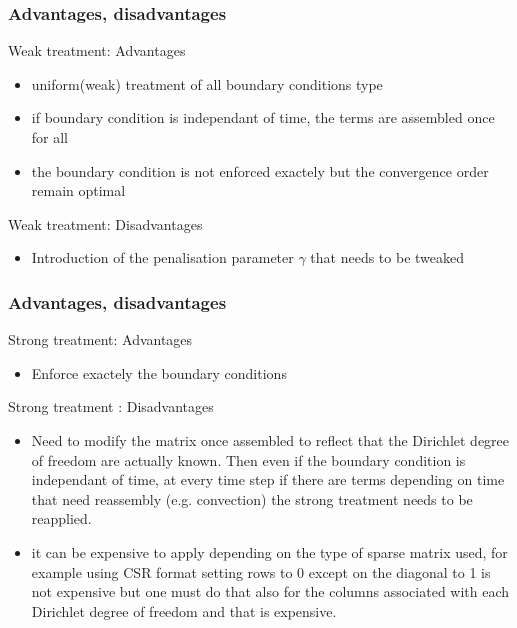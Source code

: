 \subsubsection{Advantages, disadvantages}
      \begin{remark}{Weak treatment: Advantages}
        \begin{itemize}
        \item uniform(weak) treatment of all boundary conditions type
        \item if boundary condition is independant of time, the terms
          are assembled once for all
        \item the boundary condition is not enforced exactely but the
          convergence order remain optimal
        \end{itemize}
      \end{remark}
      \begin{remark}{Weak treatment: Disadvantages}
        \begin{itemize}
        \item Introduction of the penalisation parameter $\gamma$ that
          needs to be tweaked
        \end{itemize}
      \end{remark}

\subsubsection{Advantages, disadvantages}
  \begin{remark}{Strong treatment: Advantages}
    \begin{itemize}
    \item Enforce exactely the boundary conditions
    \end{itemize}
  \end{remark}
  \begin{remark}{Strong treatment : Disadvantages}
    \begin{itemize}
    \item Need to modify the matrix once assembled to reflect that
      the Dirichlet degree of freedom are actually known. Then
          even if the boundary condition is independant of time, at
          every time step if there are terms depending on time that
          need reassembly (e.g. convection) the strong treatment needs to be reapplied.
        \item it can be expensive to apply depending on the type of
          sparse matrix used, for example using CSR format setting
          rows to 0 except on the diagonal to 1 is not expensive but
          one must do that also for the columns associated with each
          Dirichlet degree of freedom and that is expensive.
        \end{itemize}
      \end{remark}

